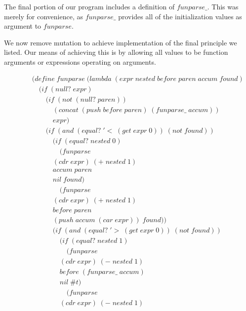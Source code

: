 The final portion of our program includes a definition of $funparse\_$. This was merely 
for convenience, as $funparse\_$ provides all of the initialization values as argument 
to $funparse$.

We now remove mutation to achieve implementation of the final principle we listed. Our 
means of achieving this is by allowing all values to be function arguments or expressions 
operating on arguments.

\begin{figure}[htp]
\caption{}\label{fig:immutableFunparse}
\begin{align*}
& (define \; funparse \; (lambda \; (expr \; nested \; before \; paren \; accum \; found) \; 
\\& \quad (if \; (null? \; expr)
\\& \qquad (if \; (not \; (null? \; paren))
\\& \qquad \quad (concat \; (push \; before \; paren) \; (funparse\_ \; accum))
\\& \qquad \quad expr)
\\& \qquad (if \; (and \; (equal? \; '< \; (get \; expr \; 0)) \; (not \; found))
\\& \qquad \quad (if \; (equal? \; nested \; 0)
\\& \qquad \qquad (funparse \; 
\\& \qquad \quad (cdr \; expr) \; (+ \; nested \; 1) \; 
\\& \qquad \quad accum \; paren \; 
\\& \qquad \quad nil \; found)
\\& \qquad \qquad (funparse \; 
\\& \qquad \quad (cdr \; expr) \; (+ \; nested \; 1) \; 
\\& \qquad \quad before \; paren \; 
\\& \qquad \quad (push \; accum \; (car \; expr)) \; found))
\\& \qquad \quad (if \; (and \; (equal? \; '> \; (get \; expr \; 0)) \; (not \; found))
\\& \qquad \qquad (if \; (equal? \; nested \; 1)
\\& \qquad \qquad \quad (funparse \; 
\\& \qquad \qquad (cdr \; expr) \; (- \; nested \; 1) \; 
\\& \qquad \qquad before \; (funparse\_ \; accum) \; 
\\& \qquad \qquad nil \; \#t)
\\& \qquad \qquad \quad (funparse \; 
\\& \qquad \qquad (cdr \; expr) \; (- \; nested \; 1) \; 

\end{align*}
\end{figure}
